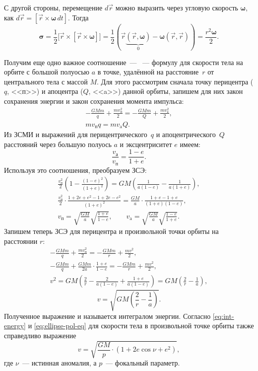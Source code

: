 С другой стороны, перемещение $d\vec{r}$ можно выразить через угловую скорость $\boldsymbol{\omega}$, как $d \vec{r} = [\vec{r} \times \boldsymbol{\omega} \,d t]$. Тогда
\begin{equation*}
	\boldsymbol{\sigma}
	= \frac{1}{2} \big[ \vec{r} \times [\vec{r} \times \boldsymbol{\omega} ]\big]
	= \frac{1}{2} \left(\vec{r} \underbrace{(\vec{r}, \boldsymbol{\omega})}_0 - \boldsymbol{\omega} ( \vec{r}, \vec{r} ) \right)
	= \frac{r^2 \boldsymbol{\omega}}{2}.
\end{equation*}

Получим еще одно важное соотношение~--- ~--- формулу для скорости тела на орбите с большой полуосью $a$ в точке, удалённой на расстояние~$r$ от центрального тела с массой $M$. Для этого рассмотрим  сначала точку перицентра ($q$, <<п>>) и апоцентра ($Q$, <<a>>) данной орбиты, запишем для них закон сохранения энергии и закон сохранения момента импульса:
\begin{gather*}
	-\frac{GMm}{q} + \frac{m v^2_\text{п}}{2} = -\frac{GMm}{Q} + \frac{m v^2_\text{а}}{2},\\
	mv_\text{п}q = mv_\text{a}Q.
\end{gather*}
Из ЗСМИ и выражений для перицентрического~$q$ и апоцентрического~$Q$ расстояний через большую полуось $a$ и эксцентриситет $e$ имеем:
\begin{equation*}
	\frac{v_\text{а}}{v_\text{п}} = \frac{1 - e}{1 + e}.
\end{equation*}
Используя это соотношения, преобразуем ЗСЭ:
\begin{gather}
	\frac{v_\text{п}^2}{2} \left( 1 - \frac{(1 -e)^2}{(1 + e)^2} \right) = GM \left( \frac{1}{a(1-e)} - \frac{1}{a(1+e)} \right),\\
	\frac{v_\text{п}^2}{2} \cdot \frac{ 1 + 2e + e^2 - 1 + 2e - e^2}{(1+e)^2} = \frac{GM}{a} \cdot \frac{1 + e - 1 +  e}{(1+e)(1-e)},\\
	v_\text{п} = \sqrt{\frac{GM}{a}}\sqrt{\frac{1+e}{1-e}}, \quad \quad v_\text{a} = \sqrt{\frac{GM}{a}}\sqrt{\frac{1-e}{1+e}}.
\end{gather}
Запишем теперь ЗСЭ для перицентра и произвольной точки орбиты на расстоянии $r$:
\begin{gather*}
	-\frac{GMm}{q} + \frac{m v^2_\text{п}}{2} = -\frac{GMm}{r} + \frac{m v^2}{2},\\
	-\frac{GMm}{q} + \frac{GMm}{2a} \cdot \frac{1+e}{1-e} = -\frac{GMm}{r} + \frac{m v^2}{2},\\
	v^2 = GM \left( \frac{2}{r} - \frac{2}{a(1 - e)} + \frac{1+e}{a (1-e) }\right) = GM \left( \frac{2}{r} - \frac{1}{a} \right),
\end{gather*}
\begin{equation}
	v = \sqrt{ GM \left( \frac{2}{r} - \frac{1}{a} \right)}.
	\label{eq:int-energy}
\end{equation}
Полученное выражение и называется интегралом энергии. Согласно \eqref{eq:int-energy} и \eqref{eq:ellipse-pol-eq} для скорости тела в произвольной точке орбиты также справедливо выражение
\begin{equation}
	v = \sqrt{\frac{GM}{p}\cdot(1 + 2 e \cos \nu + e^2)},
\end{equation}
где $\nu$~--- истинная аномалия, а $p$~--- фокальный параметр.

